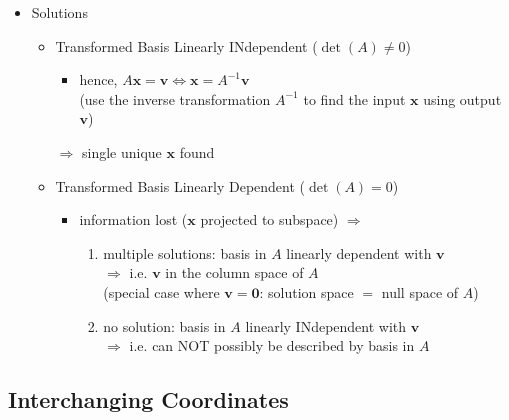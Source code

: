 \begin{itemize}
\item Solutions
	\begin{itemize}
	\item Transformed Basis Linearly INdependent ($\det(A) \neq 0$)
		\begin{itemize}
		\item hence, $A\mathbf x=\mathbf v \Leftrightarrow \mathbf x = A^{-1}\mathbf v$ \\
		(use the inverse transformation $A^{-1}$ to find the input $\mathbf x$ using output $\mathbf v$)
		\end{itemize}
		$\Rightarrow$ single unique $\mathbf x$ found
	\item Transformed Basis Linearly Dependent ($\det(A) = 0$)
		\begin{itemize}
		\item information lost ($\mathbf x$ projected to subspace) $\Rightarrow$ 
			\begin{enumerate}
			\item multiple solutions: basis in $A$ linearly dependent with $\mathbf v$ \\
			$\Rightarrow$ i.e. $\mathbf v$ in the column space of $A$ \\
			(special case where $\mathbf v=\mathbf 0$: solution space $=$ null space of $A$)
			\item no solution: basis in $A$ linearly INdependent with $\mathbf v$ \\
			$\Rightarrow$ i.e. can NOT possibly be described by basis in $A$
			\end{enumerate}
		\end{itemize}
	\end{itemize}
\end{itemize}

\subsection{Interchanging Coordinates}

